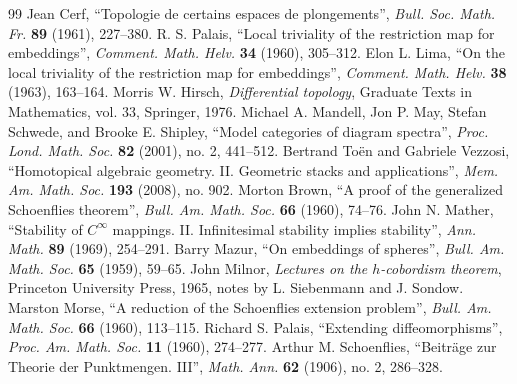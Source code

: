 \documentclass[10pt,a4paper]{amsart}
\numberwithin{equation}{section}
\theoremstyle{definition}
\theoremstyle{remark}
\begin{document}
\begin{thebibliography}{99}
 Jean Cerf, ``Topologie de certains espaces de plongements'', \emph{Bull. Soc. Math. Fr.} \textbf{89} (1961), 227--380.
 R. S. Palais, ``Local triviality of the restriction map for embeddings'', \emph{Comment. Math. Helv.} \textbf{34} (1960), 305--312.
 Elon L. Lima, ``On the local triviality of the restriction map for embeddings'', \emph{Comment. Math. Helv.} \textbf{38} (1963), 163--164.
 Morris W. Hirsch, \emph{Differential topology}, Graduate Texts in Mathematics, vol. 33, Springer, 1976.
 Michael A. Mandell, Jon P. May, Stefan Schwede, and Brooke E. Shipley, ``Model categories of diagram spectra'', \emph{Proc. Lond. Math. Soc.} \textbf{82} (2001), no. 2, 441--512.
 Bertrand To\"en and Gabriele Vezzosi, ``Homotopical algebraic geometry. II. Geometric stacks and applications'', \emph{Mem. Am. Math. Soc.} \textbf{193} (2008), no. 902.
 Morton Brown, ``A proof of the generalized Schoenflies theorem'', \emph{Bull. Am. Math. Soc.} \textbf{66} (1960), 74--76.
 John N. Mather, ``Stability of $C^\infty$ mappings. II. Infinitesimal stability implies stability'', \emph{Ann. Math.} \textbf{89} (1969), 254--291.
 Barry Mazur, ``On embeddings of spheres'', \emph{Bull. Am. Math. Soc.} \textbf{65} (1959), 59--65.
 John Milnor, \emph{Lectures on the $h$-cobordism theorem}, Princeton University Press, 1965, notes by L. Siebenmann and J. Sondow.
 Marston Morse, ``A reduction of the Schoenflies extension problem'', \emph{Bull. Am. Math. Soc.} \textbf{66} (1960), 113--115.
 Richard S. Palais, ``Extending diffeomorphisms'', \emph{Proc. Am. Math. Soc.} \textbf{11} (1960), 274--277.
 Arthur M. Schoenflies, ``Beitr\"age zur Theorie der Punktmengen. III'', \emph{Math. Ann.} \textbf{62} (1906), no. 2, 286--328.
\end{thebibliography}
\end{document}
